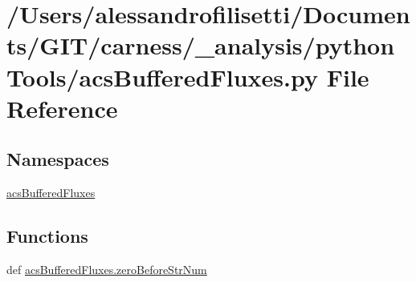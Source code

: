 \hypertarget{a00041}{\section{/\+Users/alessandrofilisetti/\+Documents/\+G\+I\+T/carness/\+\_\+analysis/python\+Tools/acs\+Buffered\+Fluxes.py File Reference}
\label{a00041}
}
\subsection*{Namespaces}
\begin{DoxyCompactItemize}
\item 
 \hyperlink{a00126}{acs\+Buffered\+Fluxes}
\end{DoxyCompactItemize}
\subsection*{Functions}
\begin{DoxyCompactItemize}
\item 
def \hyperlink{a00126_ad40fd27cb36a2086a2b8d0acadd4dbc9}{acs\+Buffered\+Fluxes.\+zero\+Before\+Str\+Num}
\end{DoxyCompactItemize}
